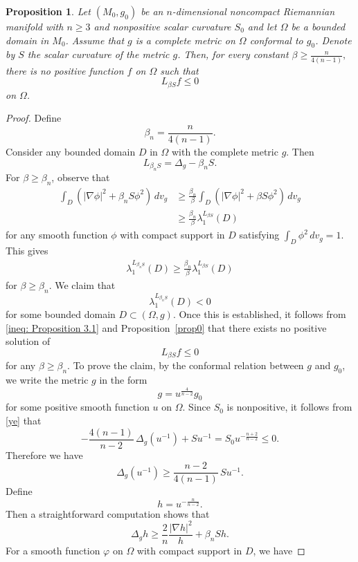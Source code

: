 \documentclass[amssymb,amstex,amsmath,11pt]{article}
\numberwithin{equation}{section}
\theoremstyle{plain}
\newtheorem{prop}[thm]{Proposition}
\theoremstyle{definition}
\theoremstyle{remark}
\newcommand{\Om}{\Omega}
\begin{document}
\begin{prop} \label{prop1}
Let $(M_0,g_0)$ be an $n$-dimensional noncompact Riemannian manifold with $n\ge 3$ and nonpositive scalar curvature $S_0$ and let $\Omega$ be a bounded domain in $M_0$. Assume that $g$ is a complete metric on $\Omega$ conformal to $g_0$. Denote by $S$ the scalar curvature of the metric $g$. Then, for every constant $\beta \ge \frac{n}{4(n-1)},$
there is no positive function $f$ on $\Omega$ such that
$$
L_{\beta S}f \le 0
$$
on $\Omega$.
\end{prop}



\begin{proof}
Define
$$\beta_n=\frac{n}{4(n-1)}.$$
Consider any bounded domain $D$ in $\Om$ with the complete metric $g$. Then
$$L_{\beta_n S} = \Delta_g - \beta_n S.$$
For $\beta\geq\beta_n$, observe that
\begin{align*}
\int_{D} (|\nabla \phi|^2+\beta_n S \phi^2)\, dv_g & \geq \frac{\beta_n}{\beta}\int_{D} (|\nabla \phi|^2+\beta S \phi^2)\, dv_g\\
& \geq \frac{\beta_n}{\beta}\lambda_1^{L_{\beta S}}(D)
\end{align*}
for any smooth function $\phi$ with compact support in $D$ satisfying $\int_D\phi^2\,dv_g=1$. This gives
\begin{align}
\lambda_1^{L_{\beta_n S}}(D) \geq \frac{\beta_n}{\beta}\lambda_1^{L_{\beta S}}(D) \label{ineq: Proposition 3.1}
\end{align}
for $\beta\geq\beta_n$. We claim that
$$
\lambda_1^{L_{\beta_n S}}(D)<0
$$
for some bounded domain $D\subset (\Omega,g)$. Once this is established, it follows from \eqref{ineq: Proposition 3.1} and Proposition~\ref{prop0} that there exists no positive solution of
$$
L_{\beta S}f\le 0
$$
for any $\beta\ge \beta_n$. To prove the claim, by the conformal relation between $g$ and $g_0$, we write the metric $g$ in the form
$$
g=u^{\frac{4}{n-2}}g_0
$$
for some positive smooth function $u$ on $\Omega$. Since $S_0$ is nonpositive, it follows from \eqref{ye} that
$$
-\frac{4(n-1)}{n-2}\,\Delta_g(u^{-1})+Su^{-1}
=
S_0u^{-\frac{n+2}{n-2}}
\le 0.
$$
Therefore we have
$$
\Delta_g(u^{-1})\ge \frac{n-2}{4(n-1)}\,Su^{-1}.
$$
Define
$$
h=u^{-\frac{n}{n-2}}.
$$
Then a straightforward computation shows that
\begin{equation}\label{2.2}
\Delta_g h\ge \frac{2}{n}\frac{|\nabla h|^2}{h}+\beta_n Sh.
\end{equation}
    For a smooth function $\varphi$ on $\Om$ with compact support in $D$, we have

\end{proof}
\end{document}
